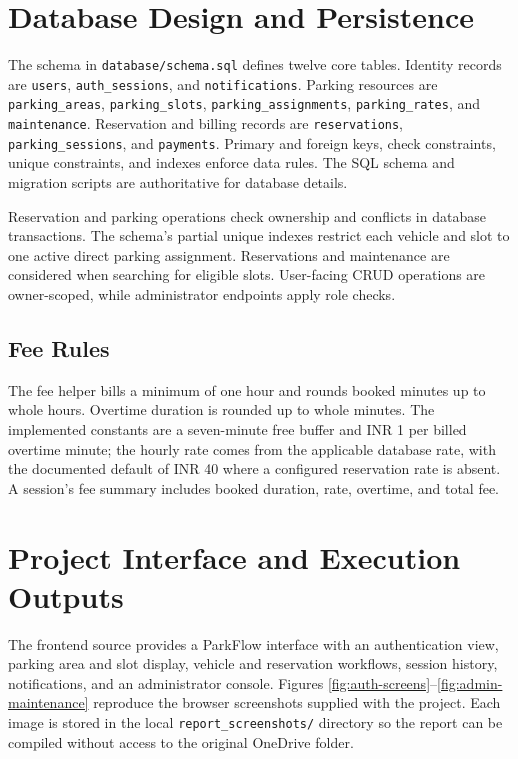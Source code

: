 \documentclass[12pt,a4paper]{article}
\begin{document}
\section{Database Design and Persistence}
The schema in \texttt{database/schema.sql} defines twelve core tables. Identity
records are \texttt{users}, \texttt{auth\_sessions}, and
\texttt{notifications}. Parking resources are \texttt{parking\_areas},
\texttt{parking\_slots}, \texttt{parking\_assignments},
\texttt{parking\_rates}, and \texttt{maintenance}. Reservation and billing
records are \texttt{reservations}, \texttt{parking\_sessions}, and
\texttt{payments}. Primary and foreign keys,
check constraints, unique constraints, and indexes enforce data rules. The
SQL schema and migration scripts are authoritative for database details.

Reservation and parking operations check ownership and conflicts in database
transactions. The schema's partial unique indexes restrict each vehicle and
slot to one active direct parking assignment. Reservations and maintenance
are considered when searching for eligible slots. User-facing CRUD operations
are owner-scoped, while administrator endpoints apply role checks.

\subsection{Fee Rules}
The fee helper bills a minimum of one hour and rounds booked minutes up to whole
hours. Overtime duration is rounded up to whole minutes. The implemented
constants are a seven-minute free buffer and INR 1 per billed overtime minute;
the hourly rate comes from the applicable database rate, with the documented
default of INR 40 where a configured reservation rate is absent. A session's
fee summary includes booked duration, rate, overtime, and total fee.

\section{Project Interface and Execution Outputs}
The frontend source provides a ParkFlow interface with an authentication view,
parking area and slot display, vehicle and reservation workflows, session
history, notifications, and an administrator console. Figures
\ref{fig:auth-screens}--\ref{fig:admin-maintenance} reproduce the browser
screenshots supplied with the project. Each image is stored in the local
\texttt{report\_screenshots/} directory so the report can be compiled without
access to the original OneDrive folder.
\end{document}
